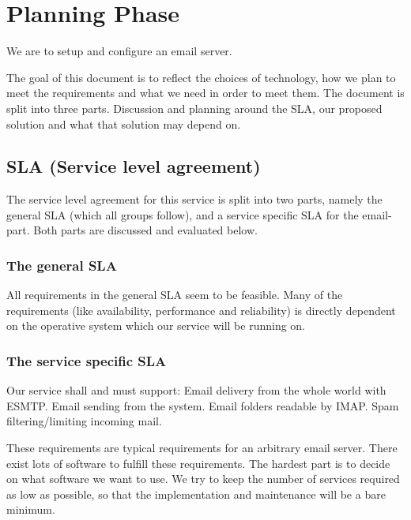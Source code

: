 \documentclass[12pt]{article}
\begin{document}

\tableofcontents

\section{Planning Phase}

We are to setup and configure an email server.

The goal of this document is to reflect the choices of technology, how
we plan to meet the requirements and what we need in order to meet them.
The document is split into three parts. Discussion and planning around
the SLA, our proposed solution and what that solution may depend on.

\subsection{SLA (Service level agreement)}
The service level agreement for this service is split into two parts,
namely the general SLA (which all groups follow), and a service specific
SLA for the email-part. Both parts are discussed and evaluated below.

\subsubsection{The general SLA}
All requirements in the general SLA seem to be feasible. Many of the
requirements (like availability, performance and reliability) is
directly dependent on the operative system which our service will be
running on. 


\subsubsection{The service specific SLA}
Our service shall and must support:
Email delivery from the whole world with ESMTP.
Email sending from the system.
Email folders readable by IMAP.
Spam filtering/limiting incoming mail.

These requirements are typical requirements for an arbitrary email
server. There exist lots of software to fulfill these requirements. The
hardest part is to decide on what software we want to use. We try to
keep the number of services required as low as possible, so that the
implementation and maintenance will be a bare minimum.
\end{document}
